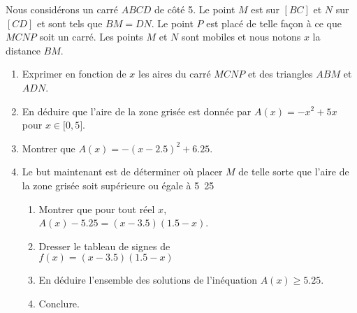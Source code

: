 
\begin{exercice}\label{exosmath-0654}

%   


    Nous considérons un carré \( ABCD\) de côté \unit{5}{\centi\meter}. Le point \( M\) est sur \( [BC]\) et \( N\) sur \( [CD]\) et sont tels que \( BM=DN\). Le point \( P\) est placé de telle façon à ce que \( MCNP\) soit un carré. Les points \( M\) et \( N\) sont mobiles et nous notons \( x\) la distance \( BM\).

    \begin{center}
   
    \end{center}

    \begin{enumerate}
        \item
            Exprimer en fonction de \( x\) les aires du carré \( MCNP\) et des triangles \( ABM\) et \( ADN\).
        \item
            En déduire que l'aire de la zone grisée est donnée par \( A(x)=-x^2+5x\) pour \( x\in\mathopen[ 0 , 5 \mathclose]\).
        \item
            Montrer que \( A(x)=-(x-2.5)^2+6.25\).
        \item
            Le but maintenant est de déterminer où placer \( M\) de telle sorte que l'aire de la zone grisée soit supérieure ou égale à \unit{5.25}{\centi\meter\squared}
            \begin{enumerate}
                \item
                    Montrer que pour tout réel \( x\), \\ \( A(x)-5.25=(x-3.5)(1.5-x)\).
                \item
                    Dresser le tableau de signes de\\ \( f(x)=(x-3.5)(1.5-x)\)
                \item
                    En déduire l'ensemble des solutions de l'inéquation \( A(x)\geq 5.25\).
                \item
                    Conclure.
            \end{enumerate}
    \end{enumerate}

\end{exercice}
